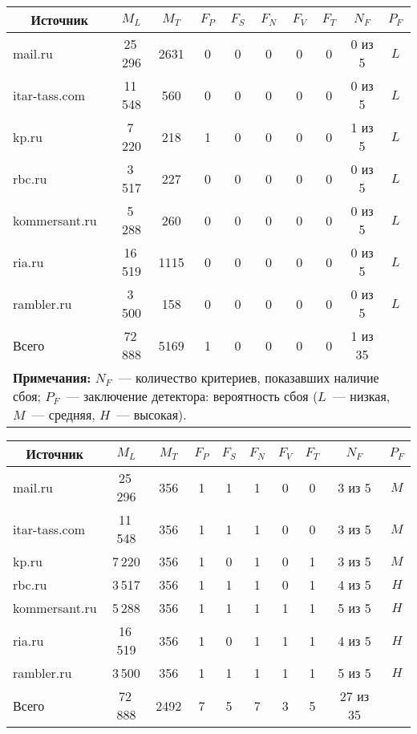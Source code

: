 \begin{multicols}{2}
\begin{table*}
\begin{center}
\begin{tabular}{|l|c|c|c|c|c|c|c|c|c|}
\hline
\multicolumn{1}{|c|}{Источник}&$M_L$&$M_T$&$F_P$&$F_S$&$F_N$&$F_V$&$F_T$&$
N_F$&$P_F$\\
\hline
{\sf mail.ru}&25\,296&2631&0&0&0&0&0&0 из 5&$L$\\
{\sf itar-tass.com}&11\,548&\hphantom{9}560&0&0&0&0&0&0 из 5&$L$\\
{\sf kp.ru}&\hphantom{9}7\,220&\hphantom{9}218&1&0&0&0&0&1 из 5&$L$\\
{\sf rbc.ru}&\hphantom{9}3\,517&\hphantom{9}227&0&0&0&0&0&0 из 5&$L$\\
{\sf kommersant.ru}&\hphantom{9}5\,288&\hphantom{9}260&0&0&0&0&0&0 из 5&$L$\\
{\sf ria.ru}&16\,519&1115&0&0&0&0&0&0 из 5&$L$\\
{\sf rambler.ru}&\hphantom{9}3\,500&\hphantom{9}158&0&0&0&0&0&0 из 5&$L$\\
\hline
Всего&72\,888&5169&1&0&0&0&0&\hphantom{9}1 из 35&\\
\hline
\multicolumn{10}{p{320pt}}{\footnotesize \textbf{Примечания:} $N_F$~--- количество критериев, 
показавших наличие сбоя; $P_F$~--- заключение детектора: вероятность сбоя 
($L$~--- низкая, $M$~--- средняя, $H$~--- высокая).}
\end{tabular}
\end{center}
\end{table*}

\setcounter{table}{3}  
\begin{table*}[b]\small %
\vspace*{-12pt}
\begin{center}
\vspace*{2ex}

\begin{tabular}{|l|c|c|c|c|c|c|c|c|c|}
\hline
\multicolumn{1}{|c|}{Источник}&$M_L$&$M_T$&$F_P$&$F_S$&$F_N$&$F_V$&$F_T$&$
N_F$&$P_F$\\
\hline
{\sf mail.ru}&25\,296&356&1&1&1&0&0&3 из 5&$M$\\
{\sf itar-tass.com}&11\,548&356&1&1&1&0&0&3 из 5&$M$\\
{\sf kp.ru}&\hphantom{9}7\,220&356&1&0&1&0&1&3 из 5&$M$\\
{\sf rbc.ru}&\hphantom{9}3\,517&356&1&1&1&0&1&4 из 5&$H$\\
{\sf kommersant.ru}&\hphantom{9}5\,288&356&1&1&1&1&1&5 из 5&$H$\\
{\sf ria.ru}&16\,519&356&1&0&1&1&1&4 из 5&$H$\\
rambler.ru&\hphantom{9}3\,500&356&1&1&1&1&1&5 из 5&$H$\\
\hline
Всего&72\,888&2492\hphantom{9}&7&5&7&3&5&27 из 35&\\
\hline
\end{tabular}
\end{center}
\vspace*{-12pt}
\end{table*}




\end{multicols}
